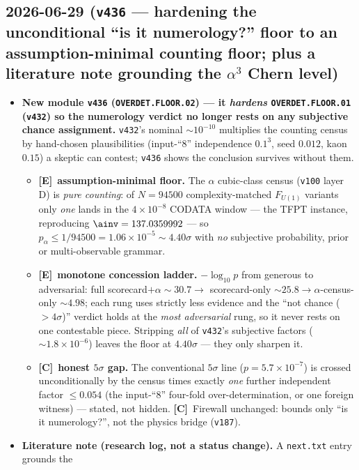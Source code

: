\documentclass[11pt]{article}
\providecommand{\mE}{\textbf{[E]}}\providecommand{\mC}{\textbf{[C]}}
\providecommand{\vref}[1]{\texttt{#1}}
\begin{document}
\subsection*{2026-06-29 (\texttt{v436} --- hardening the unconditional ``is it numerology?'' floor to an assumption-minimal counting floor; plus a literature note grounding the $\alpha^3$ Chern level)}
\begin{itemize}
\item \textbf{New module \texttt{v436} (\texttt{OVERDET.FLOOR.02}) --- it \emph{hardens} \texttt{OVERDET.FLOOR.01}
(\vref{v432}) so the numerology verdict no longer rests on any subjective chance assignment.} \vref{v432}'s
nominal ${\sim}10^{-10}$ multiplies the counting census by hand-chosen plausibilities (input-``$8$''
independence $0.1^3$, seed $0.012$, kaon $0.15$) a skeptic can contest; \vref{v436} shows the conclusion
survives without them.
\begin{itemize}
\item \mE\ \textbf{assumption-minimal floor.} The $\alpha$ cubic-class census (\vref{v100} layer D) is
\emph{pure counting}: of $N=94500$ complexity-matched $F_{U(1)}$ variants only \emph{one} lands in the
$4\times10^{-8}$ CODATA window --- the TFPT instance, reproducing $\ainv=137.0359992$ --- so
$p_\alpha\le1/94500=1.06\times10^{-5}\sim4.40\sigma$ with \emph{no} subjective probability, prior or
multi-observable grammar.
\item \mE\ \textbf{monotone concession ladder.} $-\log_{10}p$ from generous to adversarial: full
scorecard$+\alpha\sim30.7\to$ scorecard-only $\sim25.8\to\alpha$-census-only $\sim4.98$; each rung uses
strictly less evidence and the ``not chance ($>4\sigma$)'' verdict holds at the \emph{most adversarial}
rung, so it never rests on one contestable piece. Stripping \emph{all} of \vref{v432}'s subjective factors
($\sim1.8\times10^{-6}$) leaves the floor at $4.40\sigma$ --- they only sharpen it.
\item \mC\ \textbf{honest $5\sigma$ gap.} The conventional $5\sigma$ line ($p=5.7\times10^{-7}$) is crossed
unconditionally by the census times exactly \emph{one} further independent factor $\le0.054$ (the
input-``$8$'' four-fold over-determination, or one foreign witness) --- stated, not hidden. \mC\ Firewall
unchanged: bounds only ``is it numerology?'', not the physics bridge (\vref{v187}).
\end{itemize}
\item \textbf{Literature note (research log, not a status change).} A \texttt{next.txt} entry grounds the

\end{itemize}
\end{document}
